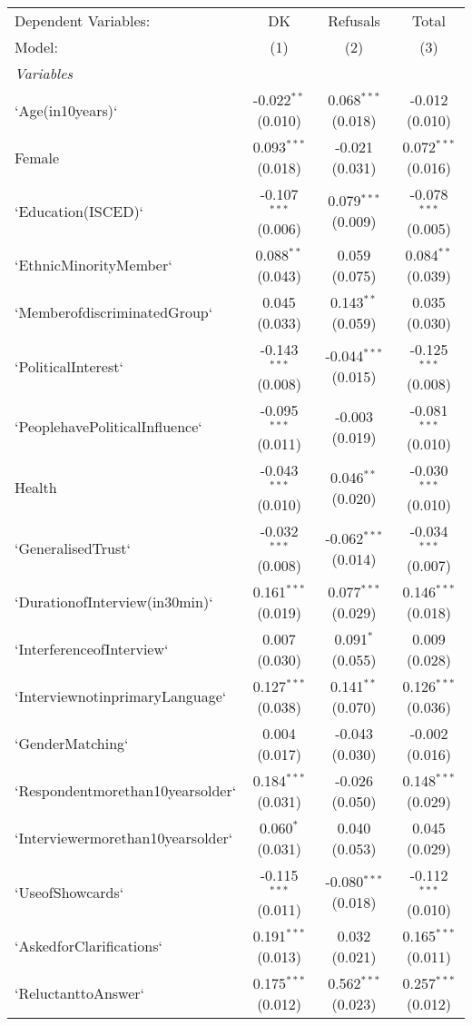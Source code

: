 \begin{tabular}{lccc}
\tabularnewline\midrule\midrule
Dependent Variables:&DK&Refusals&Total\\
Model:&(1) & (2) & (3)\\
\midrule \emph{Variables}&   &   &  \\
`Age(in10years)` & -0.022$^{**}$ (0.010) & 0.068$^{***}$ (0.018) & -0.012 (0.010)\\
Female & 0.093$^{***}$ (0.018) & -0.021 (0.031) & 0.072$^{***}$ (0.016)\\
`Education(ISCED)` & -0.107$^{***}$ (0.006) & 0.079$^{***}$ (0.009) & -0.078$^{***}$ (0.005)\\
`EthnicMinorityMember` & 0.088$^{**}$ (0.043) & 0.059 (0.075) & 0.084$^{**}$ (0.039)\\
`MemberofdiscriminatedGroup` & 0.045 (0.033) & 0.143$^{**}$ (0.059) & 0.035 (0.030)\\
`PoliticalInterest` & -0.143$^{***}$ (0.008) & -0.044$^{***}$ (0.015) & -0.125$^{***}$ (0.008)\\
`PeoplehavePoliticalInfluence` & -0.095$^{***}$ (0.011) & -0.003 (0.019) & -0.081$^{***}$ (0.010)\\
Health & -0.043$^{***}$ (0.010) & 0.046$^{**}$ (0.020) & -0.030$^{***}$ (0.010)\\
`GeneralisedTrust` & -0.032$^{***}$ (0.008) & -0.062$^{***}$ (0.014) & -0.034$^{***}$ (0.007)\\
`DurationofInterview(in30min)` & 0.161$^{***}$ (0.019) & 0.077$^{***}$ (0.029) & 0.146$^{***}$ (0.018)\\
`InterferenceofInterview` & 0.007 (0.030) & 0.091$^{*}$ (0.055) & 0.009 (0.028)\\
`InterviewnotinprimaryLanguage` & 0.127$^{***}$ (0.038) & 0.141$^{**}$ (0.070) & 0.126$^{***}$ (0.036)\\
`GenderMatching` & 0.004 (0.017) & -0.043 (0.030) & -0.002 (0.016)\\
`Respondentmorethan10yearsolder` & 0.184$^{***}$ (0.031) & -0.026 (0.050) & 0.148$^{***}$ (0.029)\\
`Interviewermorethan10yearsolder` & 0.060$^{*}$ (0.031) & 0.040 (0.053) & 0.045 (0.029)\\
`UseofShowcards` & -0.115$^{***}$ (0.011) & -0.080$^{***}$ (0.018) & -0.112$^{***}$ (0.010)\\
`AskedforClarifications` & 0.191$^{***}$ (0.013) & 0.032 (0.021) & 0.165$^{***}$ (0.011)\\
`ReluctanttoAnswer` & 0.175$^{***}$ (0.012) & 0.562$^{***}$ (0.023) & 0.257$^{***}$ (0.012)\\

\end{tabular}
